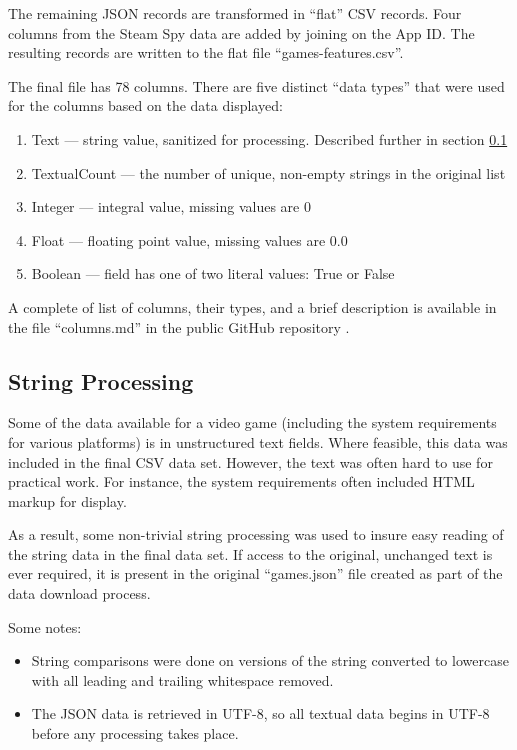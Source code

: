 \documentclass[letterpaper,10pt,twocolumn]{article}
\begin{document}
The remaining JSON records are transformed in ``flat'' CSV records. Four
columns from the Steam Spy data are added by joining on the App ID. The
resulting records are written to the flat file ``games-features.csv''.

The final file has 78 columns. There are five distinct ``data types'' that
were used for the columns based on the data displayed:

\begin{enumerate}
    \item Text --- string value, sanitized for processing. Described further in
    section \ref{data-strings}
    \item TextualCount --- the number of unique, non-empty strings in the original list
    \item Integer --- integral value, missing values are 0
    \item Float --- floating point value, missing values are 0.0
    \item Boolean --- field has one of two literal values: True or False
\end{enumerate}

A complete of list of columns, their types, and a brief description is
available in the file ``columns.md'' in the public GitHub repository
\cite{our-columns}.

\subsection{String Processing}

\label{data-strings}

Some of the data available for a video game (including the system requirements
for various platforms) is in unstructured text fields. Where feasible, this data
was included in the final CSV data set. However, the text was often hard to use
for practical work. For instance, the system requirements often included HTML
markup for display.

As a result, some non-trivial string processing was used to insure easy reading
of the string data in the final data set. If access to the original, unchanged
text is ever required, it is present in the original ``games.json'' file created
as part of the data download process.

Some notes:

\begin{itemize}
    \item String comparisons were done on versions of the string converted to
    lowercase with all leading and trailing whitespace removed.
    \item The JSON data is retrieved in UTF-8, so all textual data begins in
    UTF-8 before any processing takes place.
\end{itemize}
\end{document}
